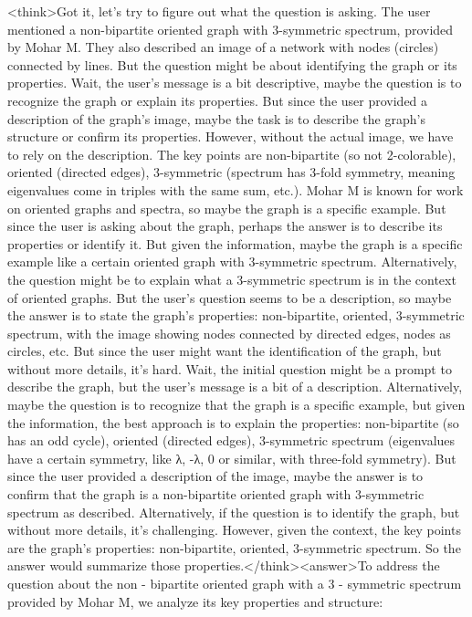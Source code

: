 <think>Got it, let's try to figure out what the question is asking. The user mentioned a non-bipartite oriented graph with 3-symmetric spectrum, provided by Mohar M. They also described an image of a network with nodes (circles) connected by lines. But the question might be about identifying the graph or its properties. Wait, the user's message is a bit descriptive, maybe the question is to recognize the graph or explain its properties. But since the user provided a description of the graph's image, maybe the task is to describe the graph's structure or confirm its properties. However, without the actual image, we have to rely on the description. The key points are non-bipartite (so not 2-colorable), oriented (directed edges), 3-symmetric (spectrum has 3-fold symmetry, meaning eigenvalues come in triples with the same sum, etc.). Mohar M is known for work on oriented graphs and spectra, so maybe the graph is a specific example. But since the user is asking about the graph, perhaps the answer is to describe its properties or identify it. But given the information, maybe the graph is a specific example like a certain oriented graph with 3-symmetric spectrum. Alternatively, the question might be to explain what a 3-symmetric spectrum is in the context of oriented graphs. But the user's question seems to be a description, so maybe the answer is to state the graph's properties: non-bipartite, oriented, 3-symmetric spectrum, with the image showing nodes connected by directed edges, nodes as circles, etc. But since the user might want the identification of the graph, but without more details, it's hard. Wait, the initial question might be a prompt to describe the graph, but the user's message is a bit of a description. Alternatively, maybe the question is to recognize that the graph is a specific example, but given the information, the best approach is to explain the properties: non-bipartite (so has an odd cycle), oriented (directed edges), 3-symmetric spectrum (eigenvalues have a certain symmetry, like λ, -λ, 0 or similar, with three-fold symmetry). But since the user provided a description of the image, maybe the answer is to confirm that the graph is a non-bipartite oriented graph with 3-symmetric spectrum as described. Alternatively, if the question is to identify the graph, but without more details, it's challenging. However, given the context, the key points are the graph's properties: non-bipartite, oriented, 3-symmetric spectrum. So the answer would summarize those properties.</think><answer>To address the question about the non - bipartite oriented graph with a 3 - symmetric spectrum provided by Mohar M, we analyze its key properties and structure:  

